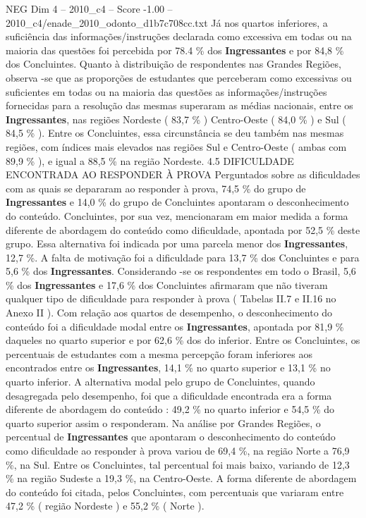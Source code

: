 \begin{textsample}{NEG Dim 4 – 2010\_c4 – Score -1.00 – 2010\_c4/enade\_2010\_odonto\_d1b7c708cc.txt}
Já nos quartos inferiores, a suficiência das informações/instruções declarada como excessiva em todas ou na maioria das questões foi percebida por 78.4 \% dos \textbf{Ingressantes} e por 84,8 \% dos Concluintes.
Quanto à distribuição de respondentes nas Grandes Regiões, observa -se que as proporções de estudantes que perceberam como excessivas ou suficientes em todas ou na maioria das questões as informações/instruções fornecidas para a resolução das mesmas superaram as médias nacionais, entre os \textbf{Ingressantes}, nas regiões Nordeste ( 83,7 \% ) Centro-Oeste ( 84,0 \% ) e Sul ( 84,5 \% ).
Entre os Concluintes, essa circunstância se deu também nas mesmas regiões, com índices mais elevados nas regiões Sul e Centro-Oeste ( ambas com 89,9 \% ), e igual a 88,5 \% na região Nordeste. 4.5 DIFICULDADE ENCONTRADA AO RESPONDER À PROVA Perguntados sobre as dificuldades com as quais se depararam ao responder à prova, 74,5 \% do grupo de \textbf{Ingressantes} e 14,0 \% do grupo de Concluintes apontaram o desconhecimento do conteúdo.
Concluintes, por sua vez, mencionaram em maior medida a forma diferente de abordagem do conteúdo como dificuldade, apontada por 52,5 \% deste grupo.
Essa alternativa foi indicada por uma parcela menor dos \textbf{Ingressantes}, 12,7 \%.
A falta de motivação foi a dificuldade para 13,7 \% dos Concluintes e para 5,6 \% dos \textbf{Ingressantes}.
Considerando -se os respondentes em todo o Brasil, 5,6 \% dos \textbf{Ingressantes} e 17,6 \% dos Concluintes afirmaram que não tiveram qualquer tipo de dificuldade para responder à prova ( Tabelas II.7 e II.16 no Anexo II ).
Com relação aos quartos de desempenho, o desconhecimento do conteúdo foi a dificuldade modal entre os \textbf{Ingressantes}, apontada por 81,9 \% daqueles no quarto superior e por 62,6 \% dos do inferior.
Entre os Concluintes, os percentuais de estudantes com a mesma percepção foram inferiores aos encontrados entre os \textbf{Ingressantes}, 14,1 \% no quarto superior e 13,1 \% no quarto inferior.
A alternativa modal pelo grupo de Concluintes, quando desagregada pelo desempenho, foi que a dificuldade encontrada era a forma diferente de abordagem do conteúdo : 49,2 \% no quarto inferior e 54,5 \% do quarto superior assim o responderam.
Na análise por Grandes Regiões, o percentual de \textbf{Ingressantes} que apontaram o desconhecimento do conteúdo como dificuldade ao responder à prova variou de 69,4 \%, na região Norte a 76,9 \%, na Sul.
Entre os Concluintes, tal percentual foi mais baixo, variando de 12,3 \% na região Sudeste a 19,3 \%, na Centro-Oeste.
A forma diferente de abordagem do conteúdo foi citada, pelos Concluintes, com percentuais que variaram entre 47,2 \% ( região Nordeste ) e 55,2 \% ( Norte ).

\end{textsample}
